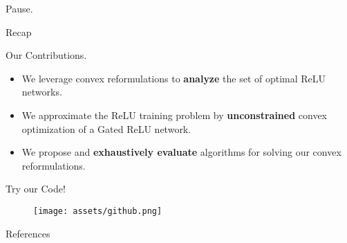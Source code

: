 \documentclass[usenames,dvipsnames,mathserif,notheorems]{beamer}
\begin{document}

\begin{frame}{}
	\begin{center}
		\huge Pause.
	\end{center}
\end{frame}

\begin{frame}{Recap}
	\begin{center}
		\huge   Our Contributions.
	\end{center}

	\vspace{2em}
	\pause
	{ \large
		\begin{itemize}
			\item We leverage convex reformulations to \textbf{analyze} the set
			      of optimal ReLU networks.
			      \pause
			      \vspace{0.5em}

			\item We approximate the ReLU training problem by \textbf{unconstrained}
			      convex optimization of a Gated ReLU network.\pause
			      \vspace{0.5em}

			\item We propose and \textbf{exhaustively evaluate} algorithms for solving
			      our convex reformulations.
		\end{itemize}
	}

\end{frame}




\begin{frame}{}
	\begin{center}
		\huge Try our Code!
	\end{center}

	\begin{figure}[]
		\centering
		\texttt{[image: assets/github.png]}
	\end{figure}
\end{frame}

\begin{frame}[allowframebreaks]{References}
	\printbibliography[]
\end{frame}
\end{document}
